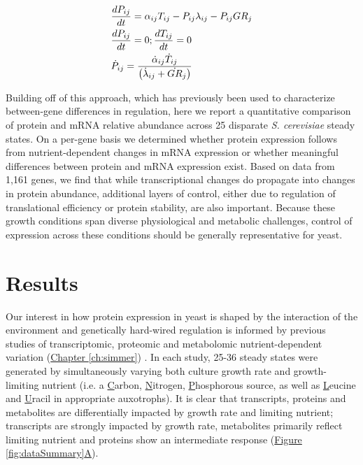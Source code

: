 \begin{align}
&\frac{dP_{ij}}{dt} = \alpha_{ij}T_{ij} - P_{ij}\lambda_{ij} - P_{ij}GR_{j}\notag\\
&\frac{dP_{ij}}{dt} = 0 ; \frac{dT_{ij}}{dt} = 0 \notag\\
&\dot{P}_{ij} = \frac{\dot{\alpha}_{ij}\dot{T}_{ij}}{\left(\dot{\lambda}_{ij} + \dot{GR}_{j}\right)}\label{steady_expression}
\end{align}

Building off of this approach, which has previously been used to characterize between-gene differences in regulation, here we report a quantitative comparison of protein and mRNA relative abundance across 25 disparate \textit{S. cerevisiae} steady states.  On a per-gene basis we determined whether protein expression follows from nutrient-dependent changes in mRNA expression or whether meaningful differences between protein and mRNA expression exist.  Based on data from 1,161 genes, we find that while transcriptional changes do propagate into changes in protein abundance, additional layers of control, either due to regulation of translational efficiency or protein stability, are also important. Because these growth conditions span diverse physiological and metabolic challenges, control of expression across these conditions should be generally representative for yeast.

\section{Results}

Our interest in how protein expression in yeast is shaped by the interaction of the environment and genetically hard-wired regulation is informed by previous studies of transcriptomic, proteomic and metabolomic nutrient-dependent variation (\hyperref[ch:simmer]{Chapter \ref{ch:simmer}}) \cite{Brauer:2008jn, Boer:2010fb}. In each study, 25-36 steady states were generated by simultaneously varying both culture growth rate and growth-limiting nutrient (i.e. a \underline{C}arbon, \underline{N}itrogen, \underline{P}hosphorous source, as well as \underline{L}eucine and \underline{U}racil in appropriate auxotrophs). It is clear that transcripts, proteins and metabolites are differentially impacted by growth rate and limiting nutrient; transcripts are strongly impacted by growth rate, metabolites primarily reflect limiting nutrient and proteins show an intermediate response (\hyperref[fig:dataSummary]{Figure \ref{fig:dataSummary}A}).


